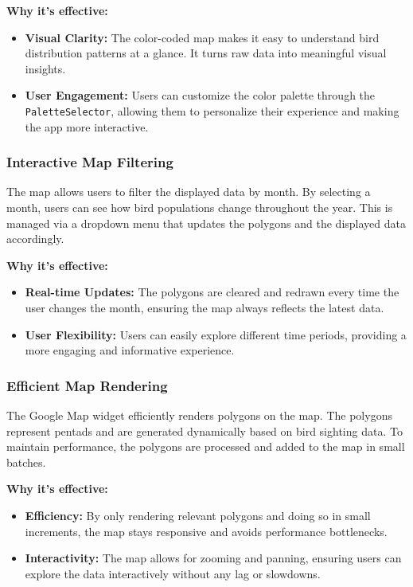 \documentclass{article}
\begin{document}
\textbf{Why it's effective:}
\begin{itemize}
    \item \textbf{Visual Clarity:} The color-coded map makes it easy to understand bird distribution patterns at a glance. It turns raw data into meaningful visual insights.
    \item \textbf{User Engagement:} Users can customize the color palette through the \texttt{PaletteSelector}, allowing them to personalize their experience and making the app more interactive.
\end{itemize}

\subsubsection{Interactive Map Filtering}
The map allows users to filter the displayed data by month. By selecting a month, users can see how bird populations change throughout the year. This is managed via a dropdown menu that updates the polygons and the displayed data accordingly.

\textbf{Why it's effective:}
\begin{itemize}
    \item \textbf{Real-time Updates:} The polygons are cleared and redrawn every time the user changes the month, ensuring the map always reflects the latest data.
    \item \textbf{User Flexibility:} Users can easily explore different time periods, providing a more engaging and informative experience.
\end{itemize}

\subsubsection{Efficient Map Rendering}
The Google Map widget efficiently renders polygons on the map. The polygons represent pentads and are generated dynamically based on bird sighting data. To maintain performance, the polygons are processed and added to the map in small batches.

\textbf{Why it's effective:}
\begin{itemize}
    \item \textbf{Efficiency:} By only rendering relevant polygons and doing so in small increments, the map stays responsive and avoids performance bottlenecks.
    \item \textbf{Interactivity:} The map allows for zooming and panning, ensuring users can explore the data interactively without any lag or slowdowns.
\end{itemize}
\end{document}
